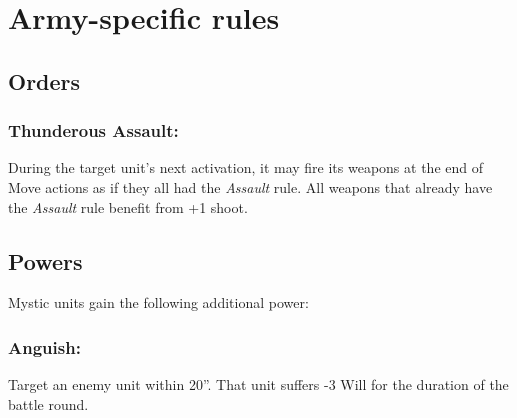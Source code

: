 \newcommand{\TwinHeavyFlamethrower}{\textbf{Twin Heavy Flamethrower}: R8 A10 Autohit D2 [Assault, Slow, Spray, Terrifying 2]}
\newcommand{\TwinLaserCannon}[1][3+]{\textbf{Twin Laser Cannon}: R40 A2 {#1} D8 [Critical 9+, Deadly D10, Slow]}





\section*{Army-specific rules}



\subsection*{Orders}

\subsubsection*{Thunderous Assault:} During the target unit's next activation, it may fire its weapons at the end of Move actions as if they all had the \textit{Assault} rule. All weapons that already have the \textit{Assault} rule benefit from +1 shoot.



\subsection*{Powers}

Mystic units gain the following additional power:

\subsubsection*{Anguish:} Target an enemy unit within 20''. That unit suffers -3 Will for the duration of the battle round.


\pagebreak



